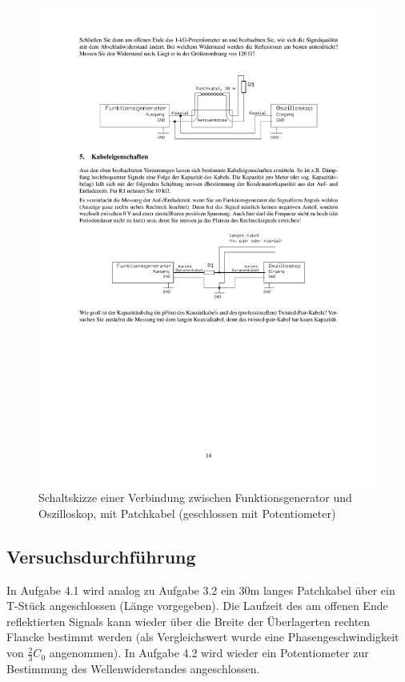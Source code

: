 \documentclass[12pt,a4paper]{article}
\begin{document}
\begin{figure}[H] 
  \centering
    \includegraphics[trim = 10mm 210mm 10mm 40mm, clip, scale = 1]{4-5.pdf}
  	\caption[Schaltskizze einer Verbindung zwischen Funktionsgenerator und Oszilloskop, mit Patchkabel (geschlossen mit Potentiometer)]{Schaltskizze einer Verbindung zwischen Funktionsgenerator und Oszilloskop, mit Patchkabel (geschlossen mit Potentiometer)\footnotemark}
  \label{fig:4.2}
\end{figure}

\subsection{Versuchsdurchführung}
In Aufgabe 4.1 wird analog zu Aufgabe 3.2 ein 30m langes Patchkabel über ein T-Stück angeschlossen (Länge vorgegeben). Die Laufzeit des am offenen Ende reflektierten Signals kann wieder über die Breite der Überlagerten rechten Flancke bestimmt werden (als Vergleichswert wurde eine Phasengeschwindigkeit von $\frac{2}{3}C_0$ angenommen).
In Aufgabe 4.2 wird wieder ein Potentiometer zur Bestimmung des Wellenwiderstandes angeschlossen.
\end{document}
